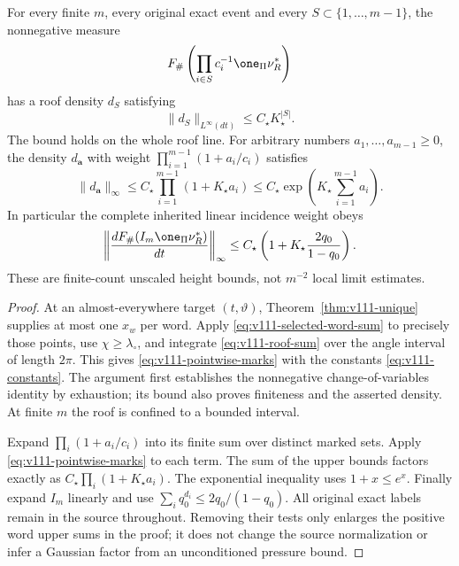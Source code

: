 \begin{theorem}
\label{thm:v111-roof-pressure}
For every finite $m$, every original exact event and every
$S\subset\{1,\ldots,m-1\}$, the nonnegative measure
\[
 F_\#\left(\prod_{i\in S}c_i^{-1}\one_\Pi\nu_R^*\right)
\]
has a roof density $d_S$ satisfying
\begin{equation}\label{eq:v111-pointwise-marks}
                    \|d_S\|_{L^\infty(dt)}\le C_\star K_\star^{|S|}.
\end{equation}
The bound holds on the whole roof line. For arbitrary numbers
$a_1,\ldots,a_{m-1}\ge0$, the density $d_{\boldsymbol a}$ with
weight $\prod_{i=1}^{m-1}(1+a_i/c_i)$ satisfies
\begin{equation}\label{eq:v111-product-insertion}
 \|d_{\boldsymbol a}\|_\infty
 \le C_\star\prod_{i=1}^{m-1}(1+K_\star a_i)
 \le C_\star\exp\left(K_\star\sum_{i=1}^{m-1}a_i\right).
\end{equation}
In particular the complete inherited linear incidence weight obeys
\begin{equation}\label{eq:v111-linear}
 \left\|\frac{dF_\#(I_m\one_\Pi\nu_R^*)}{dt}\right\|_\infty
 \le C_\star\left(1+K_\star\frac{2q_0}{1-q_0}\right).
\end{equation}
These are finite-count unscaled height bounds, not $m^{-2}$ local
limit estimates.
\end{theorem}
\begin{proof}
At an almost-everywhere target $(t,\vartheta)$,
Theorem~\ref{thm:v111-unique} supplies at most one $x_w$ per word.
Apply \eqref{eq:v111-selected-word-sum} to precisely those points,
use $\chi\ge\lambda_\circ$, and integrate
\eqref{eq:v111-roof-sum} over the angle interval of length $2\pi$.
This gives \eqref{eq:v111-pointwise-marks} with the constants
\eqref{eq:v111-constants}. The argument first establishes the
nonnegative change-of-variables identity by exhaustion; its bound
also proves finiteness and the asserted density. At finite $m$ the
roof is confined to a bounded interval.

Expand $\prod_i(1+a_i/c_i)$ into its finite sum over distinct marked
sets. Apply \eqref{eq:v111-pointwise-marks} to each term. The sum
of the upper bounds factors exactly as
$C_\star\prod_i(1+K_\star a_i)$. The exponential inequality uses
$1+x\le e^x$. Finally expand $I_m$ linearly and use
$\sum_iq_0^{d_i}\le2q_0/(1-q_0)$.
All original exact labels remain in the source throughout. Removing
their tests only enlarges the positive word upper sums in the proof;
it does not change the source normalization or infer a Gaussian
factor from an unconditioned pressure bound.
\end{proof}

